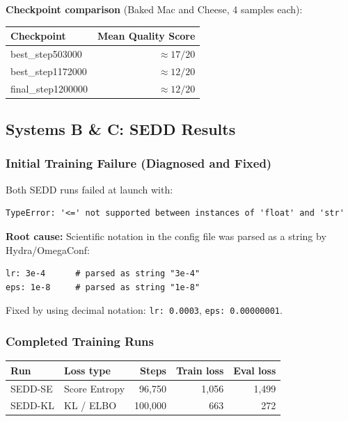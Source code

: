 \documentclass[11pt,a4paper]{article}
\begin{document}
\textbf{Checkpoint comparison} (Baked Mac and Cheese, 4 samples each):

\begin{center}
\begin{tabular}{lr}
\toprule
Checkpoint & Mean Quality Score \\
\midrule
best\_step503000  & $\approx 17/20$ \\
best\_step1172000 & $\approx 12/20$ \\
final\_step1200000 & $\approx 12/20$ \\
\bottomrule
\end{tabular}
\end{center}

\subsection{Systems B \& C: SEDD Results}

\subsubsection*{Initial Training Failure (Diagnosed and Fixed)}

Both SEDD runs failed at launch with:
\begin{lstlisting}
TypeError: '<=' not supported between instances of 'float' and 'str'
\end{lstlisting}

\textbf{Root cause:} Scientific notation in the config file was parsed as a string by Hydra/OmegaConf:
\begin{lstlisting}
lr: 3e-4      # parsed as string "3e-4"
eps: 1e-8     # parsed as string "1e-8"
\end{lstlisting}
Fixed by using decimal notation: \texttt{lr: 0.0003}, \texttt{eps: 0.00000001}.

\subsubsection*{Completed Training Runs}

\begin{center}
\begin{tabular}{llrrr}
\toprule
Run & Loss type & Steps & Train loss & Eval loss \\
\midrule
SEDD-SE & Score Entropy & 96,750  & 1,056 & 1,499 \\
SEDD-KL & KL / ELBO    & 100,000 &   663 &   272 \\
\bottomrule
\end{tabular}
\end{center}
\end{document}
